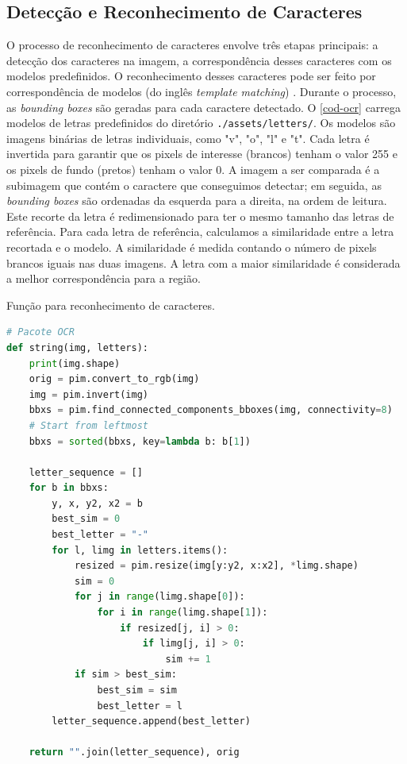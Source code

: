 \documentclass[english, 
               brazil, 
               bsc] %
               {dcomp-abntex2}
\begin{document}
\subsection{Detecção e Reconhecimento de Caracteres}


O processo de reconhecimento de caracteres envolve três etapas principais: a detecção dos caracteres na imagem, a correspondência desses caracteres com os modelos predefinidos. O reconhecimento desses caracteres pode ser feito por correspondência de modelos (do inglês \textit{template matching}) \cite[12.2]{gonzalez2008digital}.  Durante o processo, as \textit{bounding boxes} são geradas para cada caractere detectado. O \autoref{cod-ocr} carrega modelos de letras predefinidos do diretório \texttt{./assets/letters/}. Os modelos são imagens binárias de letras individuais, como "v", "o", "l" e "t". Cada letra é invertida para garantir que os pixels de interesse (brancos) tenham o valor 255 e os pixels de fundo (pretos) tenham o valor 0. A imagem a ser comparada é a subimagem que contém o caractere que conseguimos detectar; em seguida, as \textit{bounding boxes} são ordenadas da esquerda para a direita, na ordem de leitura. Este recorte da letra é redimensionado para ter o mesmo tamanho das letras de referência. Para cada letra de referência, calculamos a similaridade entre a letra recortada e o modelo. A similaridade é medida contando o número de pixels brancos iguais nas duas imagens. A letra com a maior similaridade é considerada a melhor correspondência para a região.

\begin{codigo}[h]
  \caption{\small Função para reconhecimento de caracteres.}
 \label{cod-ocr}
\begin{lstlisting}[language=python]
# Pacote OCR
def string(img, letters):
    print(img.shape)
    orig = pim.convert_to_rgb(img)
    img = pim.invert(img)
    bbxs = pim.find_connected_components_bboxes(img, connectivity=8)
    # Start from leftmost
    bbxs = sorted(bbxs, key=lambda b: b[1])

    letter_sequence = []
    for b in bbxs:
        y, x, y2, x2 = b
        best_sim = 0
        best_letter = "-"
        for l, limg in letters.items():
            resized = pim.resize(img[y:y2, x:x2], *limg.shape)
            sim = 0
            for j in range(limg.shape[0]):
                for i in range(limg.shape[1]):
                    if resized[j, i] > 0:
                        if limg[j, i] > 0:
                            sim += 1
            if sim > best_sim:
                best_sim = sim
                best_letter = l
        letter_sequence.append(best_letter)

    return "".join(letter_sequence), orig
\end{lstlisting}
\end{codigo}
\end{document}
